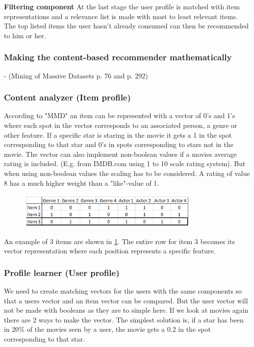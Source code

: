 \textbf{Filtering component}
At the last stage the user profile is matched with item representations and a relevance list is made with most to least relevant items. The top listed items the user hasn't already consumed can then be recommended to him or her.
 
\subsubsection{Making the content-based recommender mathematically}
- (Mining of Massive Datasets p. 76 and p. 292)

\subsubsection{Content analyzer (Item profile)}

According to "MMD" an item can be represented with a vector of 0's and 1's where each spot in the vector corresponds to an associated person, a genre or other feature. If a specific star is staring in the movie it gets a 1 in the spot corresponding to that star and 0's in spots corresponding to stars not in the movie. The vector can also implement non-boolean values if a movies average rating is included. (E.g. from IMDB.com using 1 to 10 scale rating system). But when using non-boolean values the scaling has to be considered. A rating of value 8 has a much higher weight than a "like"-value of 1.

\begin{figure}[H]
\centering
\includegraphics[width=0.8\textwidth]{Images/Vectorrepresentationitems.png}
\caption{}
\label{VrepItem}
\end{figure}

An example of 3 items are shown in \ref{VrepItem}. The entire row for item 3 becomes its vector representation where each position represents a specific feature.  
 
\subsubsection{Profile learner (User profile)}

We need to create matching vectors for the users with the same components so that a users vector and an item vector can be compared. But the user vector will not be made with booleans as they are to simple here. If we look at movies again there are 2 ways to make the vector. The simplest solution is, if a star has been in 20\% of the movies seen by a user, the movie gets a 0.2 in the spot corresponding to that star.

